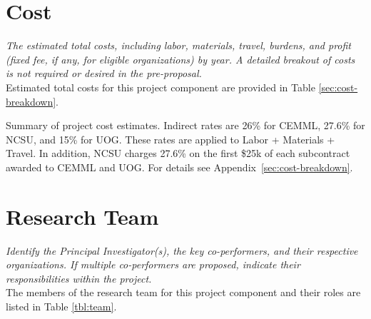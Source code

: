 \documentclass[11pt,english,letterpaper]{scrartcl}
\begin{document}
\begin{comment}
Month 2: Use annotations to train an object detector for CRB damage using the Faster R-CNN model implemented in the TensorFlow object detection API. This work requires setting up a virtual machine with graphics processing unit (GPU).

Month 3: Evaluate results from the trained object detector. If precision is insufficient, collect more annotated videos and add these to the training set.

Month 4: Develop a software system which will take raw video GPS tracks as input, outputting CRB damage maps and statistics.

Month 12: Prepare final report.

\end{comment}

\section{Cost}

\textit{The estimated total costs, including labor, materials, travel, burdens, and profit	(fixed fee, if any, for eligible organizations) by year. A detailed breakout of costs is not	required or desired in the pre-proposal.}\\

Estimated total costs for this project component are provided in Table \ref{sec:cost-breakdown}.

\begin{table}[h]
	\centering
	\caption{Summary of project cost estimates.
		Indirect rates are 26\% for CEMML, 27.6\% for NCSU, and 15\% for UOG.
		These rates are applied to Labor + Materials + Travel.
		In addition, NCSU charges 27.6\% on the first \$25k of each subcontract awarded to CEMML and UOG. For details see Appendix~\ref{sec:cost-breakdown}.}	
%	
	\label{tbl:cost}
\end{table}

\section{Research Team}

\textit{Identify the Principal Investigator(s), the key co-performers, and their respective organizations. If multiple co-performers are proposed, indicate their responsibilities within the project.}\\

The members of the research team for this project component and their roles are listed in Table \ref{tbl:team}.
\end{document}
